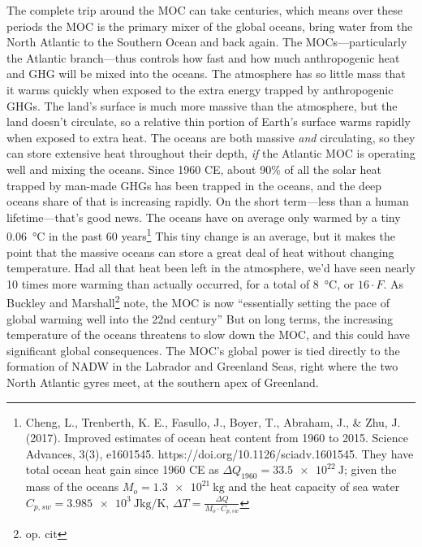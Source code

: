 {The complete trip around the MOC can take centuries, which means over these periods the MOC is the primary mixer of the global oceans, bring water from the North Atlantic to the Southern Ocean and back again. The MOCs---particularly the Atlantic branch---thus controls how fast and how much anthropogenic heat and GHG will be mixed into the oceans. The atmosphere has so little mass that it warms quickly when exposed to the extra energy trapped by anthropogenic GHGs. The land's surface is much more massive than the atmosphere, but the land doesn't circulate, so a relative thin portion of Earth's surface warms rapidly when exposed to extra heat. The oceans are both massive \emph{and} circulating, so they can store extensive heat throughout their depth, \emph{if} the Atlantic MOC is operating well and mixing the oceans. Since 1960 CE, about 90\% of all the solar heat trapped by man-made GHGs has been trapped in the oceans, and the deep oceans share of that is increasing rapidly. On the short term---less than a human lifetime---that's good news. The oceans have on average only warmed by a tiny \SI{0.06}{\celsius} in the past 60 years\footnote{Cheng, L., Trenberth, K. E., Fasullo, J., Boyer, T., Abraham, J., \& Zhu, J. (2017). Improved estimates of ocean heat content from 1960 to 2015. Science Advances, 3(3), e1601545. https://doi.org/10.1126/sciadv.1601545. They have total ocean heat gain since 1960 CE as $\Delta Q_{1960}=\SI{33.5e22}{\joule}$; given the mass of the oceans $M_o=\SI{1.3e21}{\kilogram}$ and the heat capacity of sea water $C_{p, sw}=\SI{3.985e3}{\joule\kilogram\per\kelvin}$, $\Delta T=\frac{\Delta Q}{M_o\cdot C_{p, sw}}$} This tiny change is an average, but it makes the point that the massive oceans can store a great deal of heat without changing temperature. Had all that heat been left in the atmosphere, we'd have seen nearly 10 times more warming than actually occurred, for a total of \SI{8}{\celsius}, or $16\cdot F$. As Buckley and Marshall\footnote{op. cit} note, the MOC is now ``essentially setting the pace of global warming well into the 22nd century'' But on long terms, the increasing temperature of the oceans threatens to slow down the MOC, and this could have significant global consequences. The MOC's global power is tied directly to the formation of NADW in the Labrador and Greenland Seas, right where the two North Atlantic gyres meet, at the southern apex of Greenland.\\
}
